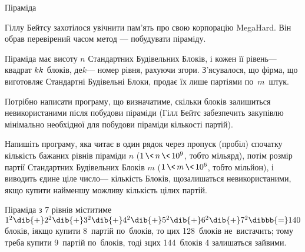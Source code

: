 \begin{problemAllDefault}{Піраміда}

Гіллу Бейтсу захотілося увічнити пам'ять про свою корпорацію MegaHard. Він обрав перевірений часом метод --- побудувати піраміду.

Піраміда має висоту $n$ Стандартних Будівельних Блоків, і кожен її рівень\nolinebreak[3] --- квадрат $k{\*}k$ блоків, де\nolinebreak[3] $k$\nolinebreak[3] --- номер рівня, рахуючи згори. З'ясувалося, що фірма, що виготовляє Стандартні Будівельні Блоки, продає їх лише партіями по~$m$~штук.

{

Потрібно написати програму, що визначатиме, скільки блоків залишиться не\nolinebreak[3] використаними після побудови піраміди (Гілл Бейтс забезпечить закупівлю мінімально необхідної для побудови піраміди кількості партій).

Напишіть програму, яка читає в один рядок через пропуск (пробіл) спочатку кількість бажаних рівнів піраміди $n$ (${1\,{\<}\,n\,{\<}\,10^9}$, тобто мільярд), потім розмір партії Стандартних Будівельних Блоків $m$ (${1\,{\<}\,m\,{\<}\,10^6}$, тобто мільйон), і виводить єдине ціле число\nolinebreak[3] --- кількість Блоків, що\nolinebreak[3] залишаться не\nolinebreak[3] використаними, якщо купити найменшу можливу кількість цілих партій.

}

\Example
\begin{exampleSimple}{4em}{4em}%
%
\end{exampleSimple}

\Note
Піраміда з 7 рівнів міститиме $1^2\dib{{+}}2^2\dib{{+}}3^2\dib{{+}}4^2\dib{{+}}5^2\dib{{+}}6^2\dib{{+}}7^2\dibbb{{=}}140$ 
блоків, і\nolinebreak[3] якщо купити 8~партій по~блоків, то цих 128~блоків не~вистачить; тому треба купити 9~партій по~блоків, тоді з\nolinebreak[3] цих 144~блоків 4 залишаться зайвими.


\end{problemAllDefault}
